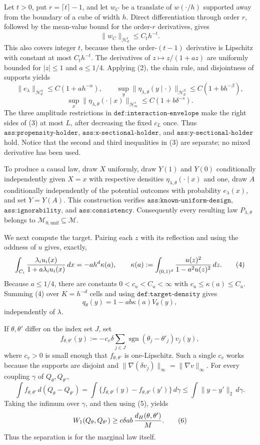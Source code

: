 Let \(t>0\), put \(r=\lceil t\rceil-1\), and let \(w_C\) be a translate of \(w(\cdot/h)\) supported away from the boundary of a cube of width \(h\).  Direct differentiation through order \(r\), followed by the mean-value bound for the order-\(r\) derivatives, gives
\[
 \lVert w_C\rVert_{\mathcal H_d^t}\leq C_t h^{-t}.
 \tag{2}
\]
This also covers integer \(t\), because then the order-\((t-1)\) derivative is Lipschitz with constant at most \(C_t h^{-t}\).  The derivatives of \(z\mapsto z/(1+az)\) are uniformly bounded for \(|z|\leq1\) and \(a\leq1/4\).  Applying (2), the chain rule, and disjointness of supports yields
\[
 \lVert e_\lambda\rVert_{\mathcal H_d^\alpha}
 \leq C(1+ah^{-\alpha}),\qquad
 \sup_y\lVert\eta_{\lambda,\theta}(y\mid\cdot)\rVert_{\mathcal H_d^\beta}
 \leq C(1+bh^{-\beta}),
\]
\[
 \sup_x\lVert\eta_{\lambda,\theta}(\cdot\mid x)\rVert_{\mathcal H_m^s}
 \leq C(1+b\delta^{-s}).
 \tag{3}
\]
The three amplitude restrictions in \(\texttt{def:interaction-envelope}\) make the right sides of (3) at most \(L\), after decreasing the fixed \(c_L\) once.  Thus \(\texttt{ass:propensity-holder}\), \(\texttt{ass:x-sectional-holder}\), and \(\texttt{ass:y-sectional-holder}\) hold.  Notice that the second and third inequalities in (3) are separate; no mixed derivative has been used.

To produce a causal law, draw \(X\) uniformly, draw \(Y(1)\) and \(Y(0)\) conditionally independently given \(X=x\) with respective densities \(\eta_{\lambda,\theta}(\cdot\mid x)\) and one, draw \(A\) conditionally independently of the potential outcomes with probability \(e_\lambda(x)\), and set \(Y=Y(A)\).  This construction verifies \(\texttt{ass:known-uniform-design}\), \(\texttt{ass:ignorability}\), and \(\texttt{ass:consistency}\).  Consequently every resulting law \(P_{\lambda,\theta}\) belongs to \(\mathcal M_{0,\mathrm{unif}}\subseteq\mathcal M\).

We next compute the target.  Pairing each \(z\) with its reflection and using the oddness of \(u\) gives, exactly,
\[
 \int_{C_i}{\lambda_i u_i(x)\over1+a\lambda_i u_i(x)}\,dx
 =-ah^d\kappa(a),\qquad
 \kappa(a):=\int_{(0,1)^d}{u(z)^2\over1-a^2u(z)^2}\,dz.
 \tag{4}
\]
Because \(a\leq1/4\), there are constants \(0<c_u<C_u<\infty\) with \(c_u\leq\kappa(a)\leq C_u\).  Summing (4) over \(K=h^{-d}\) cells and using \(\texttt{def:target-density}\) gives
\[
 q_\theta(y)=1-ab\kappa(a)V_\theta(y),
 \tag{5}
\]
independently of \(\lambda\).

If \(\theta,\theta'\) differ on the index set \(J\), set
\[
 f_{\theta,\theta'}(y)
 :=-c_v\delta\sum_{j\in J}
       \operatorname{sgn}(\theta_j-\theta'_j)v_j(y),
\]
where \(c_v>0\) is small enough that \(f_{\theta,\theta'}\) is one-Lipschitz.  Such a single \(c_v\) works because the supports are disjoint and \(\lVert\nabla(\delta v_j)\rVert_\infty=\lVert\nabla v\rVert_\infty\).  For every coupling \(\gamma\) of \(Q_\theta,Q_{\theta'}\),
\[
 \int f_{\theta,\theta'}\,d(Q_\theta-Q_{\theta'})
 =\int\{f_{\theta,\theta'}(y)-f_{\theta,\theta'}(y')\}\,d\gamma
 \leq\int\lVert y-y'\rVert_2\,d\gamma.
\]
Taking the infimum over \(\gamma\), and then using (5), yields
\[
 W_1(Q_\theta,Q_{\theta'})
 \geq c\delta ab\,{d_H(\theta,\theta')\over M}.
 \tag{6}
\]
Thus the separation is for the marginal law itself.

